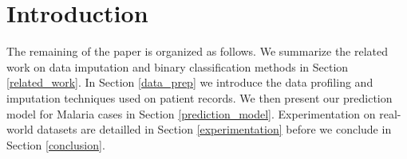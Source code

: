 \section{Introduction}\label{intro}












The remaining of the paper is organized as follows. We summarize the related work on data imputation and binary classification methods in Section \ref{related_work}.
In Section \ref{data_prep} we introduce the data profiling and imputation techniques used on patient records. We then present our prediction model for Malaria cases in Section \ref{prediction_model}.
Experimentation on real-world datasets are detailled in Section \ref{experimentation} before we conclude in Section \ref{conclusion}. 
